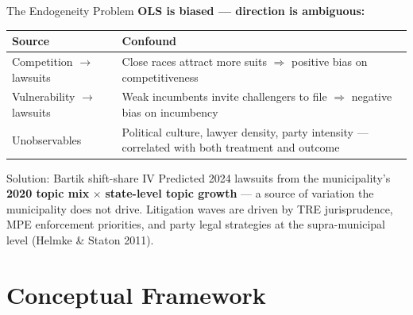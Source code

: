 \documentclass[aspectratio=169,10pt]{beamer}
\begin{document}
\begin{frame}{The Endogeneity Problem}
\textbf{OLS is biased --- direction is ambiguous:}
\medskip

\footnotesize
\renewcommand{\arraystretch}{1.3}
\begin{tabular}{L{4.2cm}L{7.0cm}}
  \toprule
  Source & Confound \\
  \midrule
  Competition $\to$ lawsuits & Close races attract more suits $\Rightarrow$ positive bias on competitiveness \\
  Vulnerability $\to$ lawsuits & Weak incumbents invite challengers to file $\Rightarrow$ negative bias on incumbency \\
  Unobservables & Political culture, lawyer density, party intensity --- correlated with both treatment and outcome \\
  \bottomrule
\end{tabular}
\normalsize
\bigskip

\begin{alertblock}{Solution: Bartik shift-share IV}
  \footnotesize
  Predicted 2024 lawsuits from the municipality's \textbf{2020 topic mix} $\times$ \textbf{state-level topic growth} --- a source of variation the municipality does not drive. Litigation waves are driven by TRE jurisprudence, MPE enforcement priorities, and party legal strategies at the supra-municipal level (Helmke \& Staton 2011).
\end{alertblock}
\end{frame}


\section{Conceptual Framework}
\end{document}
